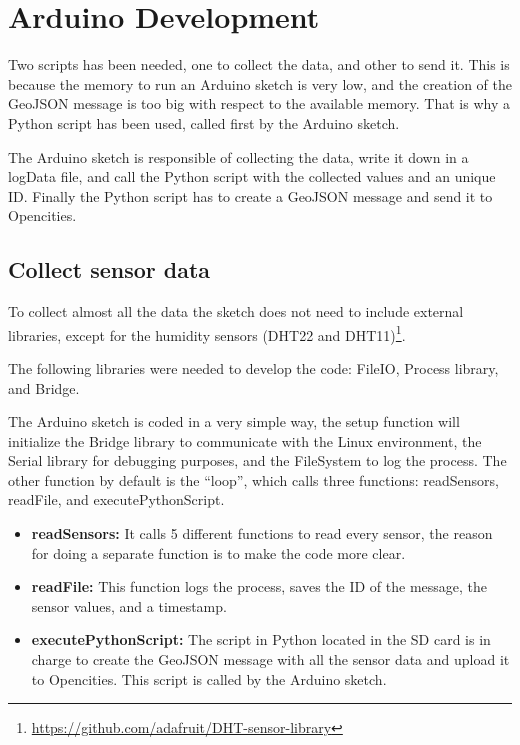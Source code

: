 \documentclass[12pt, a4paper,twoside]{tesi_upf}
\begin{document}
  \section{Arduino Development}
    
    Two scripts has been needed, one to collect the data, and other to send it. This is because the memory to run an Arduino sketch is very low, and the creation of the GeoJSON message is too big with respect to the available memory. That is why a Python script has been used, called first by the Arduino sketch.
    
    The Arduino sketch is responsible of collecting the data, write it down in a logData file, and call the Python script with the collected values and an unique ID. Finally the Python script has to create a GeoJSON message and send it to Opencities.
    
    \subsection{Collect sensor data}
    
      To collect almost all the data the sketch does not need to include external libraries, except for the humidity sensors (DHT22 and DHT11)\footnote{\url{https://github.com/adafruit/DHT-sensor-library}}.
      
      The following libraries were needed to develop the code: FileIO, Process library, and Bridge.
      
      The Arduino sketch is coded in a very simple way, the setup function will initialize the Bridge library to communicate with the Linux environment, the Serial library for debugging purposes, and the FileSystem to log the process.
      The other function by default is the ``loop'', which calls three functions: readSensors, readFile, and executePythonScript.
      
      \begin{itemize}
        \item {\bf readSensors:} It calls 5 different functions to read every sensor, the reason for doing a separate function is to make the code more clear.
        \item {\bf readFile:} This function logs the process, saves the ID of the message, the sensor values, and a timestamp.
        \item {\bf executePythonScript:} The script in Python located in the SD card is in charge to create the GeoJSON message with all the sensor data and upload it to Opencities. This script is called by the Arduino sketch.
      \end{itemize}
      
\end{document}
